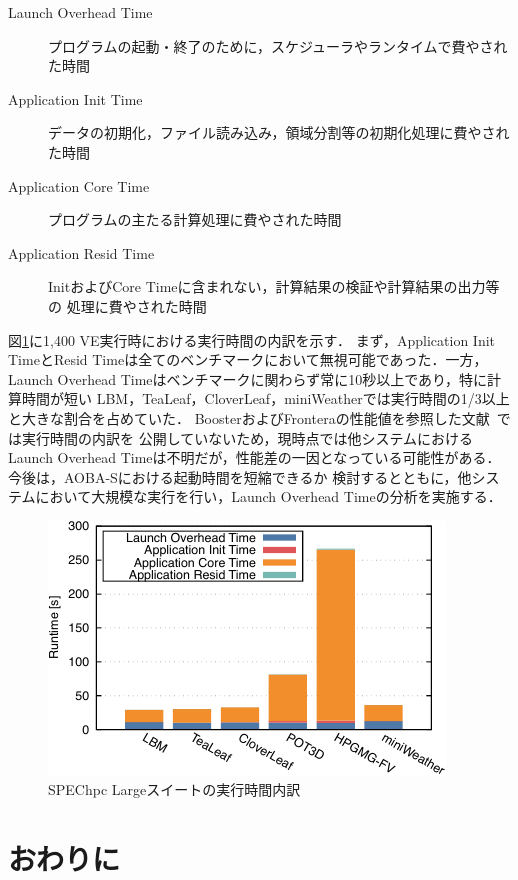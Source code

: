 ﻿\documentclass[submit,techrep,noauthor]{ipsj}
\begin{document}
\begin{description}
  \item[Launch Overhead Time] プログラムの起動・終了のために，スケジューラやランタイムで費やされた時間
  \item[Application Init Time] データの初期化，ファイル読み込み，領域分割等の初期化処理に費やされた時間
  \item[Application Core Time] プログラムの主たる計算処理に費やされた時間
  \item[Application Resid Time] InitおよびCore Timeに含まれない，計算結果の検証や計算結果の出力等の
      処理に費やされた時間
\end{description}

図\ref{fig:spechpc-profile2}に1,400 VE実行時における実行時間の内訳を示す．
まず，Application Init TimeとResid Timeは全てのベンチマークにおいて無視可能であった．一方，
Launch Overhead Timeはベンチマークに関わらず常に10秒以上であり，特に計算時間が短い
LBM，TeaLeaf，CloverLeaf，miniWeatherでは実行時間の1/3以上と大きな割合を占めていた．
BoosterおよびFronteraの性能値を参照した文献~\cite{Brunst2022}では実行時間の内訳を
公開していないため，現時点では他システムにおけるLaunch Overhead
Timeは不明だが，性能差の一因となっている可能性がある．今後は，AOBA-Sにおける起動時間を短縮できるか
検討するとともに，他システムにおいて大規模な実行を行い，Launch Overhead Timeの分析を実施する．

\begin{figure}[tb]
  \centering
  \includegraphics{figs/spechpc_profile2.pdf}
  \caption{SPEChpc Largeスイートの実行時間内訳}\label{fig:spechpc-profile2}
\end{figure}

\section{おわりに}
\end{document}
